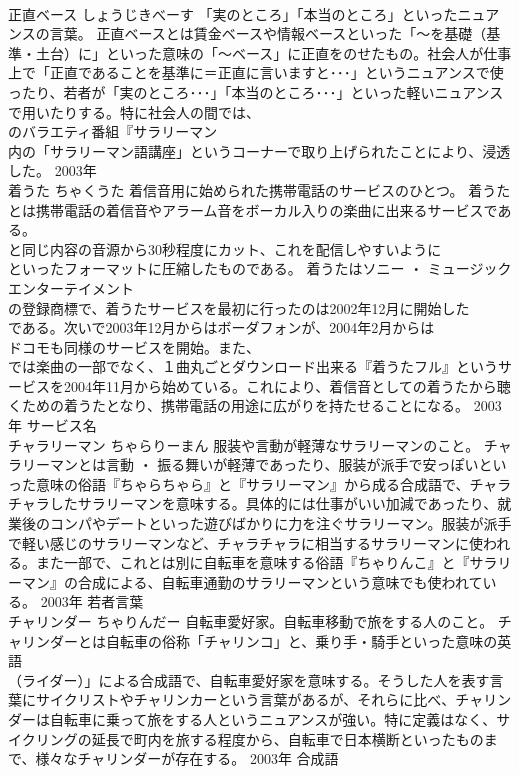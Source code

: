 \documentclass[8pt]{extreport}
\begin{document}
\begin{CJK}{UTF8}{min}
\\	正直ベース	しょうじきべーす	「実のところ」「本当のところ」といったニュアンスの言葉。	正直ベースとは賃金ベースや情報ベースといった「～を基礎（基準・土台）に」といった意味の「～ベース」に正直をのせたもの。社会人が仕事上で「正直であることを基準に＝正直に言いますと･･･」というニュアンスで使ったり、若者が「実のところ･･･」「本当のところ･･･」といった軽いニュアンスで用いたりする。特に社会人の間では、
\\	のバラエティ番組『サラリーマン
\\	内の「サラリーマン語講座」というコーナーで取り上げられたことにより、浸透した。	2003年	
\\	着うた	ちゃくうた	着信音用に始められた携帯電話のサービスのひとつ。	着うたとは携帯電話の着信音やアラーム音をボーカル入りの楽曲に出来るサービスである。
\\	と同じ内容の音源から30秒程度にカット、これを配信しやすいように
\\	といったフォーマットに圧縮したものである。 着うたはソニー ・ ミュージックエンターテイメント
\\	の登録商標で、着うたサービスを最初に行ったのは2002年12月に開始した
\\	である。次いで2003年12月からはボーダフォンが、2004年2月からは
\\	ドコモも同様のサービスを開始。また、
\\	では楽曲の一部でなく、１曲丸ごとダウンロード出来る『着うたフル』というサービスを2004年11月から始めている。これにより、着信音としての着うたから聴くための着うたとなり、携帯電話の用途に広がりを持たせることになる。	2003年	サービス名	
\\	チャラリーマン	ちゃらりーまん	服装や言動が軽薄なサラリーマンのこと。	チャラリーマンとは言動 ・ 振る舞いが軽薄であったり、服装が派手で安っぽいといった意味の俗語『ちゃらちゃら』と『サラリーマン』から成る合成語で、チャラチャラしたサラリーマンを意味する。具体的には仕事がいい加減であったり、就業後のコンパやデートといった遊びばかりに力を注ぐサラリーマン。服装が派手で軽い感じのサラリーマンなど、チャラチャラに相当するサラリーマンに使われる。また一部で、これとは別に自転車を意味する俗語『ちゃりんこ』と『サラリーマン』の合成による、自転車通勤のサラリーマンという意味でも使われている。	2003年	若者言葉	
\\	チャリンダー	ちゃりんだー	自転車愛好家。自転車移動で旅をする人のこと。	チャリンダーとは自転車の俗称「チャリンコ」と、乗り手・騎手といった意味の英語
\\	（ライダー）」による合成語で、自転車愛好家を意味する。そうした人を表す言葉にサイクリストやチャリンカーという言葉があるが、それらに比べ、チャリンダーは自転車に乗って旅をする人というニュアンスが強い。特に定義はなく、サイクリングの延長で町内を旅する程度から、自転車で日本横断といったものまで、様々なチャリンダーが存在する。	2003年	合成語	

\end{CJK}
\end{document}
